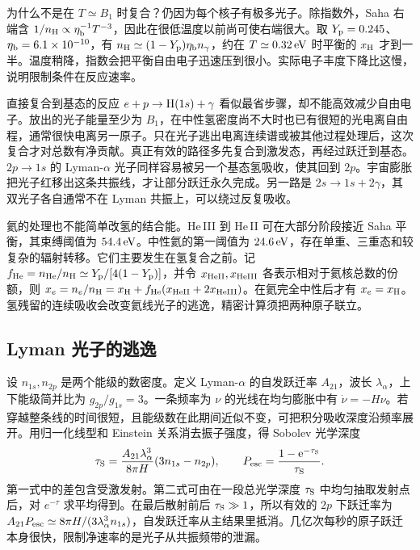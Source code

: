 为什么不是在 $T\simeq B_1$ 时复合？仍因为每个核子有极多光子。除指数外，Saha 右端含 $1/n_{\rm H}\propto\eta_{\rm b}^{-1}T^{-3}$，因此在很低温度以前尚可使右端很大。取 $Y_{\rm p}=0.245$、$\eta_{\rm b}=6.1\times10^{-10}$，有 $n_{\rm H}\simeq(1-Y_{\rm p})\eta_{\rm b}n_\gamma$，约在 $T\simeq0.32\,{\rm eV}$ 时平衡的 $x_{\rm H}$ 才到一半。温度稍降，指数会把平衡自由电子迅速压到很小。实际电子丰度下降比这慢，说明限制条件在反应速率。

直接复合到基态的反应 $e+p\to{\rm H}(1s)+\gamma$ 看似最省步骤，却不能高效减少自由电子。放出的光子能量至少为 $B_1$，在中性氢密度尚不大时也已有很短的光电离自由程，通常很快电离另一原子。只在光子逃出电离连续谱或被其他过程处理后，这次复合才对总数有净贡献。真正有效的路径多先复合到激发态，再经过跃迁到基态。$2p\to1s$ 的 Lyman-$\alpha$ 光子同样容易被另一个基态氢吸收，使其回到 $2p$。宇宙膨胀把光子红移出这条共振线，才让部分跃迁永久完成。另一路是 $2s\to1s+2\gamma$，其双光子各自通常不在 Lyman 共振上，可以绕过反复吸收。

氦的处理也不能简单改氢的结合能。He\,III 到 He\,II 可在大部分阶段接近 Saha 平衡，其束缚阈值为 $54.4\,{\rm eV}$。中性氦的第一阈值为 $24.6\,{\rm eV}$，存在单重、三重态和较复杂的辐射转移。它们主要发生在氢复合之前。记 $f_{\rm He}=n_{\rm He}/n_{\rm H}\simeq Y_{\rm p}/[4(1-Y_{\rm p})]$，并令 $x_{\rm HeII},x_{\rm HeIII}$ 各表示相对于氦核总数的份额，则 $x_e=n_e/n_{\rm H}=x_{\rm H}+f_{\rm He}(x_{\rm HeII}+2x_{\rm HeIII})$。在氦完全中性后才有 $x_e=x_{\rm H}$。氢残留的连续吸收会改变氦线光子的逃逸，精密计算须把两种原子联立。

\subsection{Lyman 光子的逃逸}

设 $n_{1s},n_{2p}$ 是两个能级的数密度。定义 Lyman-$\alpha$ 的自发跃迁率 $A_{21}$，波长 $\lambda_\alpha$，上下能级简并比为 $g_{2p}/g_{1s}=3$。一条频率为 $\nu$ 的光线在均匀膨胀中有 $\dot\nu=-H\nu$。若穿越整条线的时间很短，且能级数在此期间近似不变，可把积分吸收深度沿频率展开。用归一化线型和 Einstein 关系消去振子强度，得 Sobolev 光学深度
\begin{equation}\label{eq:cosmo-lyman-escape}
 \tau_{\rm S}=\frac{A_{21}\lambda_\alpha^3}{8\pi H}
       (3n_{1s}-n_{2p}),\qquad
 P_{\rm esc}=\frac{1-\mathrm{e}^{-\tau_{\rm S}}}{\tau_{\rm S}} .
\end{equation}
第一式中的差包含受激发射。第二式可由在一段总光学深度 $\tau_{\rm S}$ 中均匀抽取发射点后，对 $e^{-\tau}$ 求平均得到。在最后散射前后 $\tau_{\rm S}\gg1$，所以有效的 $2p$ 下跃迁率为 $A_{21}P_{\rm esc}\simeq8\pi H/(3\lambda_\alpha^3 n_{1s})$，自发跃迁率从主结果里抵消。几亿次每秒的原子跃迁本身很快，限制净速率的是光子从共振频带的泄漏。

